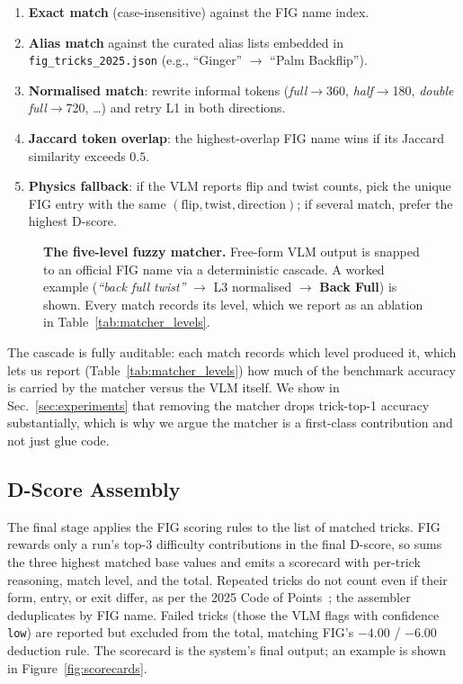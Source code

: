 \begin{enumerate}
  \item[\textbf{L1}] \textbf{Exact match} (case-insensitive) against the
        FIG name index.
  \item[\textbf{L2}] \textbf{Alias match} against the curated alias lists
        embedded in \texttt{fig\_tricks\_2025.json} (e.g., ``Ginger''
        $\rightarrow$ ``Palm Backflip'').
  \item[\textbf{L3}] \textbf{Normalised match}: rewrite informal tokens
        (\emph{full}$\rightarrow$360, \emph{half}$\rightarrow$180,
        \emph{double full}$\rightarrow$720, \ldots) and retry L1 in both
        directions.
  \item[\textbf{L4}] \textbf{Jaccard token overlap}: the highest-overlap
        FIG name wins if its Jaccard similarity exceeds $0.5$.
  \item[\textbf{L5}] \textbf{Physics fallback}: if the VLM reports flip and
        twist counts, pick the unique FIG entry with the same
        $(\text{flip}, \text{twist}, \text{direction})$; if several match,
        prefer the highest D-score.
\end{enumerate}

\begin{figure}[t]
  \centering
  
  \caption{\textbf{The five-level fuzzy matcher.} Free-form VLM output
  is snapped to an official FIG name via a deterministic cascade. A worked
  example (\emph{``back full twist''} $\rightarrow$ L3 normalised
  $\rightarrow$ \textbf{Back Full}) is shown. Every match records its
  level, which we report as an ablation in Table~\ref{tab:matcher_levels}.}
  \label{fig:matcher}
\end{figure}

The cascade is fully auditable: each match records which level produced it,
which lets us report (Table~\ref{tab:matcher_levels}) how much of the
benchmark accuracy is carried by the matcher versus the VLM itself. We show
in Sec.~\ref{sec:experiments} that removing the matcher drops
trick-top-1 accuracy substantially, which is why we argue the matcher is a
first-class contribution and not just glue code.

\subsection{D-Score Assembly}
\label{sec:system:dscore}

The final stage applies the FIG scoring rules to the list of matched
tricks. FIG rewards only a run's top-3 difficulty contributions in the
final D-score, so \sys{} sums the three highest matched base values and
emits a scorecard with per-trick reasoning, match level, and the total.
Repeated tricks do not count even if their form, entry, or exit differ, as
per the 2025 Code of Points~\cite{fig2025codepoints}; the assembler
deduplicates by FIG name. Failed tricks (those the VLM flags with confidence
\texttt{low}) are reported but excluded from the total, matching FIG's
$-4.00$ / $-6.00$ deduction rule. The scorecard is the system's final
output; an example is shown in Figure~\ref{fig:scorecards}.

